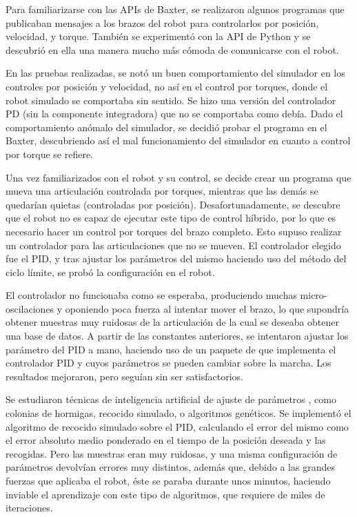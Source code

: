 Para familiarizarse con las APIs de Baxter, se realizaron algunos programas que publicaban mensajes a los brazos del robot para controlarlos por posición, velocidad, y torque. También se experimentó con la API de Python y se descubrió en ella una manera mucho más cómoda de comunicarse con el robot.

En las pruebas realizadas, se notó un buen comportamiento del simulador en los controles por posición y velocidad, no así en el control por torques, donde el robot simulado se comportaba sin sentido. Se hizo una versión del controlador PD (sin la componente integradora) que no se comportaba como debía. Dado el comportamiento anómalo del simulador, se decidió probar el programa en el Baxter, descubriendo así el mal funcionamiento del simulador en cuanto a control por torque se refiere.

Una vez familiarizados con el robot y su control, se decide crear un programa que mueva una articulación controlada por torques, mientras que las demás se quedarían quietas (controladas por posición). Desafortunadamente, se descubre que el robot no es capaz de ejecutar este tipo de control híbrido, por lo que es necesario hacer un control por torques del brazo completo. Esto supuso realizar un controlador para las articulaciones que no se mueven. El controlador elegido fue el PID, y tras ajustar los parámetros del mismo haciendo uso del método del ciclo límite, se probó la configuración en el robot.

El controlador no funcionaba como se esperaba, produciendo muchas micro-oscilaciones y oponiendo poca fuerza al intentar mover el brazo, lo que supondría obtener muestras muy ruidosas de la articulación de la cual se deseaba obtener una base de datos. A partir de las constantes anteriores, se intentaron ajustar los parámetro del PID a mano, haciendo uso de un paquete de \ros que implementa el controlador PID y cuyos parámetros se pueden cambiar sobre la marcha. Los resultados mejoraron, pero seguían sin ser satisfactorios.

Se estudiaron técnicas de inteligencia artificial de ajuste de parámetros \cite{wright2015coordinate}\cite{ruge2012aplicacion}, como colonias de hormigas, recocido simulado, o algoritmos genéticos. Se implementó el algoritmo de recocido simulado sobre el PID, calculando el error del mismo como el error absoluto medio ponderado en el tiempo de la posición deseada y las recogidas. Pero las muestras eran muy ruidosas, y una misma configuración de parámetros devolvían errores muy distintos, además que, debido a las grandes fuerzas que aplicaba el robot, éste se paraba durante unos minutos, haciendo inviable el aprendizaje con este tipo de algoritmos, que requiere de miles de iteraciones.

